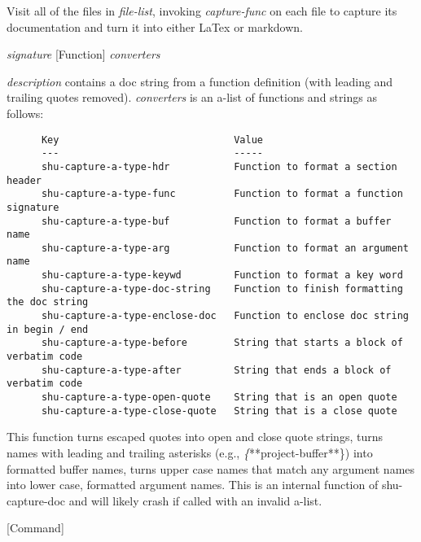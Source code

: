 \begin{doc-string}
Visit all of the files in \emph{file-list}, invoking \emph{capture-func} on each
file to capture its documentation and turn it into either LaTex or
markdown.
\end{doc-string}

\vspace{1em}
\noindent
{}
\usebox{\funcname}\emph{signature}
 \hfill [Function]
\hspace*{\wd\funcname}\emph{converters}

\begin{doc-string}
\emph{description} contains a doc string from a function definition (with leading
and trailing quotes removed).  \emph{converters} is an a-list of functions and strings as
follows:

\begin{verbatim}
      Key                              Value
      ---                              -----
      shu-capture-a-type-hdr           Function to format a section header
      shu-capture-a-type-func          Function to format a function signature
      shu-capture-a-type-buf           Function to format a buffer name
      shu-capture-a-type-arg           Function to format an argument name
      shu-capture-a-type-keywd         Function to format a key word
      shu-capture-a-type-doc-string    Function to finish formatting the doc string
      shu-capture-a-type-enclose-doc   Function to enclose doc string in begin / end
      shu-capture-a-type-before        String that starts a block of verbatim code
      shu-capture-a-type-after         String that ends a block of verbatim code
      shu-capture-a-type-open-quote    String that is an open quote
      shu-capture-a-type-close-quote   String that is a close quote
\end{verbatim}

This function turns escaped quotes into open and close quote strings, turns names
with leading and trailing asterisks (e.g., \emph\{**project-buffer**\}) into formatted buffer
names, turns upper case names that match any argument names into lower case,
formatted argument names.  This is an internal function of shu-capture-doc and
will likely crash if called with an invalid a-list.
\end{doc-string}

\vspace{1em}
\noindent
{}
\usebox{\funcname}
 \hfill [Command]

